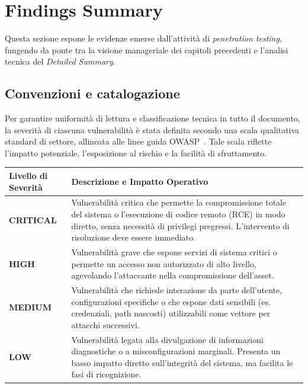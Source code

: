 \documentclass[11pt]{report}
\newcommand{\sevCRIT}{\textcolor{sevCritico}{\textbf{CRITICAL}}}
\newcommand{\sevHIGH}{\textcolor{sevElevato}{\textbf{HIGH}}}
\newcommand{\sevMED}{\textcolor{sevMedio}{\textbf{MEDIUM}}}
\newcommand{\sevLOW}{\textcolor{sevBasso}{\textbf{LOW}}}
\begin{document}
	\chapter{Findings Summary}
	Questa sezione espone le evidenze emerse dall'attività di \textit{penetration testing}, fungendo da ponte tra la visione manageriale dei capitoli precedenti e l'analisi tecnica del \textit{Detailed Summary}.
	
	\section{Convenzioni e catalogazione}
	\label{sec:convenzioni}
	Per garantire uniformità di lettura e classificazione tecnica in tutto il documento, la severità di ciascuna vulnerabilità è stata definita secondo una scala qualitativa standard di settore, allineata alle linee guida OWASP~\cite{owasp-top10}. Tale scala riflette l'impatto potenziale, l'esposizione al rischio e la facilità di sfruttamento.
	
	\vspace{0.3cm}
	\begin{table}[H]
		\centering
		\renewcommand{\arraystretch}{1.6} 
		\begin{tabular}{>{\centering\arraybackslash}p{3.5cm} p{11.5cm}}
			\toprule
			\textbf{Livello di Severità} & \textbf{Descrizione e Impatto Operativo} \\
			\midrule
			
			\sevCRIT & Vulnerabilità critica che permette la compromissione totale del sistema o l'esecuzione di codice remoto (RCE) in modo diretto, senza necessità di privilegi pregressi. L'intervento di risoluzione deve essere immediato. \\
			
			\sevHIGH & Vulnerabilità grave che espone servizi di sistema critici o permette un accesso non autorizzato di alto livello, agevolando l'attaccante nella compromissione dell'asset. \\
			
			\sevMED & Vulnerabilità che richiede interazione da parte dell'utente, configurazioni specifiche o che espone dati sensibili (es. credenziali, path nascosti) utilizzabili come vettore per attacchi successivi. \\
			
			\sevLOW & Vulnerabilità legata alla divulgazione di informazioni diagnostiche o a misconfigurazioni marginali. Presenta un basso impatto diretto sull'integrità del sistema, ma facilita le fasi di ricognizione. \\
			
			\bottomrule
		\end{tabular}
	\end{table}
	\vspace{0.3cm}
	
\end{document}
